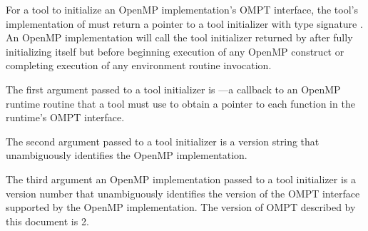 \descr
For a tool to initialize an OpenMP implementation's OMPT interface,
the tool's implementation of  must return a 
pointer to a tool initializer with type signature .
An OpenMP implementation will call the tool initializer returned by
 after fully initializing itself but before 
beginning execution of any OpenMP construct
or completing execution of any environment routine invocation.  

\argdesc
The first argument passed to a tool initializer 
is ---a callback 
to an OpenMP runtime routine that a tool must use to 
obtain a pointer to each function in the runtime's OMPT interface.

\begin{comment}
All functions in the OMPT interface are marked with \code{OMPT\_API}, which
indicates that the only way a tool can obtain bindings for them
is using the \plc{lookup} callback.

The \code{lookup} callback is necessary in the case when an OpenMP runtime 
is dynamically loaded by a shared library. In this case, 
OMPT interface functions provided by the library may 
not be visible to a preloaded tool.
\end{comment}

The second argument passed to a tool initializer 
is a version string that unambiguously identifies the OpenMP implementation.

\begin{comment}
This argument is useful to tool developers trying to debug a statically-linked executable that contains both a tool implementation and an OpenMP implementation.
Knowing exactly what version of an OpenMP implementation is present 
may be helpful when diagnosing a problem, e.g., identifying an old runtime system that may be incompatible with a newer tool.
\end{comment}

The third argument an OpenMP implementation passed to a tool initializer 
is a version number that unambiguously identifies the version of the 
OMPT interface supported by the OpenMP implementation.  
The version of OMPT described by this document is 2.

